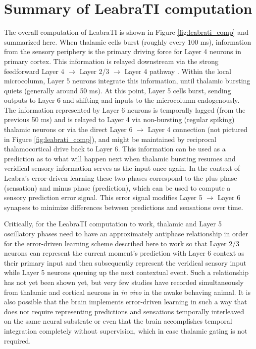 \documentclass[defaultstyle,12pt]{thesis}
\begin{document}
{\section{Summary of LeabraTI computation}
The overall computation of LeabraTI is shown in Figure \ref{fig:leabrati_comp} and summarized here. When thalamic cells burst (roughly every 100 ms), information from the sensory periphery is the primary driving force for Layer 4 neurons in primary cortex. This information is relayed downstream via the strong feedforward Layer 4 $\rightarrow$ Layer 2/3 $\rightarrow$ Layer 4 pathway \cite{FellemanVanEssen91}. Within the local microcolumn, Layer 5 neurons integrate this information, until thalamic bursting quiets (generally around 50 ms). At this point, Layer 5 cells burst, sending outputs to Layer 6 and shifting and inputs to the microcolumn  endogenously. The information represented by Layer 6 neurons is temporally lagged (from the previous 50 ms) and is relayed to Layer 4 via non-bursting (regular spiking) thalamic neurons or via the direct Layer 6 $\rightarrow$ Layer 4 connection (not pictured in Figure \ref{fig:leabrati_comp}), and might be maintained by reciprocal thalamocortical drive back to Layer 6. This information can be used as a prediction as to what will happen next when thalamic bursting resumes and veridical sensory information serves as the input once again. In the context of Leabra's error-driven learning these two phases correspond to the plus phase (sensation) and minus phase (prediction), which can be used to compute a sensory prediction error signal. This error signal modifies Layer 5 $\rightarrow$ Layer 6 synapses to minimize differences between predictions and sensations over time.

Critically, for the LeabraTI computation to work, thalamic and Layer 5 oscillatory phases need to have an approximately antiphase relationship in order for the error-driven learning scheme described here to work so that Layer 2/3 neurons can represent the current moment's prediction with Layer 6 context as their primary input and then subsequently represent the veridical sensory input while Layer 5 neurons queuing up the next contextual event. Such a relationship has not yet been shown yet, but very few studies have recorded simultaneously from thalamic and cortical neurons in \textit{in vivo} in the awake behaving animal. It is also possible that the brain implements error-driven learning in such a way that does not require representing predictions and sensations temporally interleaved on the same neural substrate or even that the brain accomplishes temporal integration completely without supervision, which in case thalamic gating is not required.

}
\end{document}
